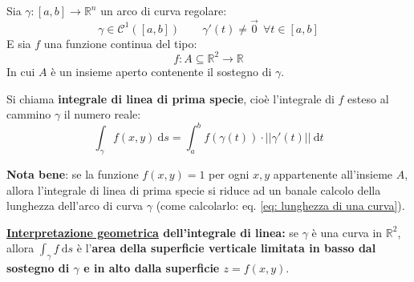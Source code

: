 \documentclass[a4paper]{article}
\newcommand{\definition}[1]{\textcolor{Red3}{\textbf{#1}}}
\begin{document}
	\begin{boxdef}
		Sia $\gamma : \left[a,b\right] \rightarrow \mathbb{R}^{n}$ un arco di curva regolare:
		\begin{equation*}
			\gamma \in \mathcal{C}^{1}\left(\left[a,b\right]\right) \hspace{2em} \gamma'\left(t\right) \ne \overset{\rightarrow}{0} \:\:\forall t \in \left[a,b\right]
		\end{equation*}
		E sia $f$ una funzione continua del tipo:
		\begin{equation*}
			f : A \subseteq \mathbb{R}^{2} \rightarrow \mathbb{R}
		\end{equation*}
		In cui $A$ è un insieme aperto contenente il sostegno di $\gamma$.

		Si chiama \definition{integrale di linea di prima specie}, cioè l'integrale di $f$ esteso al cammino $\gamma$ il numero reale:
		\begin{equation}\label{eq: integrale di linea di prima specie}
			\displaystyle\int_{\gamma} f\left(x,y\right) \:\mathrm{d}s = \displaystyle\int_{a}^{b} f\left(\gamma\left(t\right)\right) \cdot \left|\left| \gamma'\left(t\right) \right|\right| \:\mathrm{d}t
		\end{equation}
	\end{boxdef}

	\noindent
	\textbf{Nota bene}: se la funzione $f\left(x,y\right) = 1$ per ogni $x,y$ appartenente all'insieme $A$, allora l'integrale di linea di prima specie si riduce ad un banale calcolo della lunghezza dell'arco di curva $\gamma$ (come calcolarlo: eq. \ref{eq: lunghezza di una curva}).\newline

	\noindent
	\definition{\underline{Interpretazione geometrica} dell'integrale di linea:} se $\gamma$ è una curva in $\mathbb{R}^{2}$, allora $\displaystyle\int_{\gamma} f \:\mathrm{d}s$ è l'\textbf{area della superficie verticale limitata in basso dal sostegno di $\gamma$ e in alto dalla superficie $z = f\left(x,y\right)$}.
\end{document}
